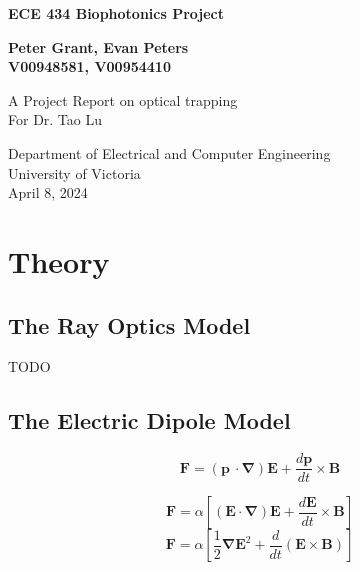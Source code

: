 \documentclass{article}
\begin{document}
\begin{titlepage}
    \begin{center}
        \vspace*{2cm}
 
        \huge
        \textbf{ECE 434 Biophotonics Project}
     
        \vspace{1.5cm}
        \Large
        \textbf{Peter Grant, Evan Peters\\
        V00948581, V00954410}
 
        \vfill
             
        A Project Report on optical trapping\\
        For Dr. Tao Lu     

        \vspace{0.8cm}
      

             
        Department of Electrical and Computer Engineering\\
        University of Victoria\\
        April 8, 2024
             
    \end{center}
\end{titlepage}


\tableofcontents
\newpage

\section*{Theory}

\subsection*{The Ray Optics Model}

TODO


\subsection*{The Electric Dipole Model}

\[ \mathbf{F} = (\mathbf{p}\ \cdot\mathbf{\nabla})\mathbf{E} + \frac{d\mathbf{p}}{dt}\times\mathbf{B} \]


\[ \mathbf{F} = \alpha\left[ (\mathbf{E}\cdot\mathbf{\nabla})\mathbf{E} + \frac{d\mathbf{E}}{dt}\times\mathbf{B} \right]  \]
\[ \mathbf{F} = \alpha\left[ \frac{1}{2}\mathbf{\nabla}\mathbf{E}^2 + \frac{d}{dt}(\mathbf{E}\times\mathbf{B}) \right]  \]
\end{document}
